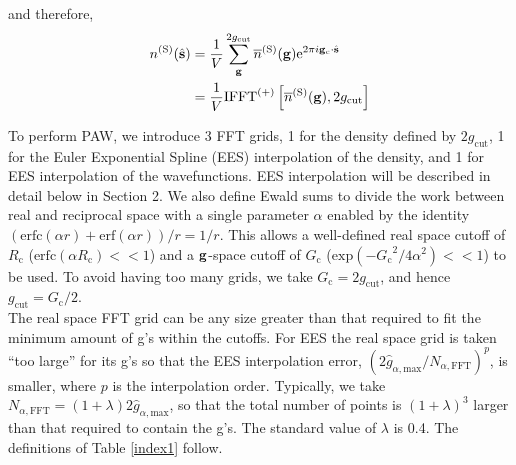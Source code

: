 \documentclass[paper=a4, fontsize=11pt]{article} %
\numberwithin{equation}{section} %
\numberwithin{figure}{section} %
\numberwithin{table}{section} %
\newcommand{\ol}{\overline}
\newcommand{\bs}{{\bf{s}}}
\newcommand{\bg}{{\bf{g}}}
\newcommand{\rexp}{{\mathrm{exp}}}
\newcommand{\rS}{{\mathrm{S}}}
\newcommand{\rcut}{{\mathrm{cut}}}
\newcommand{\re}{{\mathrm{e}}}
\newcommand{\rerf}{{\mathrm{erf}}}
\newcommand{\rerfc}{{\mathrm{erfc}}}
\newcommand{\gc}{{\bg_c}}
\newcommand{\igcs}{2\pi i\gc\cdot\hat \bs}
\newcommand{\Rc}{{R_{\mathrm{c}}}}
\newcommand{\Gc}{{G_{\mathrm{c}}}}
\begin{document}
and therefore, 
\begin{equation}
\begin{split}
n^{(\rS)}(\hat \bs)
&= \frac{1}{V}\sum_{\bg}^{2g_\rcut} \ol{n}^{(\rS)}(\bg)\re^{\igcs} \\
&= \frac{1}{V}\mathrm{IFFT}^{(+)}\left[\ol{n}^{(\rS)}(\bg),2g_\rcut\right]\\
\end{split}
\end{equation}

To perform PAW, we introduce 3 FFT grids, 1 for the density defined by $2g_\rcut$, 1 for the Euler Exponential Spline (EES) interpolation of the density, and 1 for EES interpolation of the wavefunctions. EES interpolation will be described in detail below in Section 2.  We also define Ewald sums to divide the work between real and reciprocal space with a single parameter $\alpha$ enabled by the identity $(\rerfc(\alpha r)+\rerf(\alpha r))/r = 1/r$. This allows a well-defined real space cutoff of $\Rc$ ($\rerfc(\alpha \Rc)<<1$) and a $\bg$-space cutoff of $\Gc$ ($\rexp(-\Gc^2/4\alpha^2)<<1$) to be used. To avoid having too many grids, we take $\Gc = 2g_\rcut$, and hence $g_\rcut = \Gc/2$. \\

The real space FFT grid can be any size greater than that required to fit the minimum amount of g's within the cutoffs.
For EES the real space grid is taken ``too large'' for its g's
so that the EES interpolation error, $(2\hat{g}_{\alpha,\mathrm{max}}/N_{\alpha,\mathrm{FFT}})^p$, is smaller, where $p$ is the interpolation order. Typically, we take $N_{\alpha,\mathrm{FFT}}=(1+\lambda)2\hat{g}_{\alpha,\mathrm{max}}$, so that the total number of points is $(1+\lambda)^3$ larger than that required to contain the g's. The standard value of $\lambda$ is 0.4. The definitions of Table \ref{index1} follow.
\end{document}
